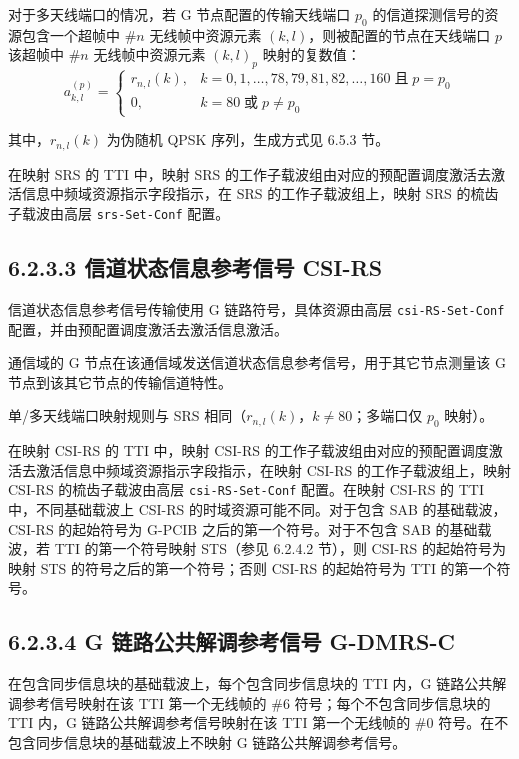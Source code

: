 \documentclass[11pt,a4paper]{ctexart}
\begin{document}
对于多天线端口的情况，若 G 节点配置的传输天线端口 $p_0$ 的信道探测信号的资源包含一个超帧中 \#$n$ 无线帧中资源元素 $(k,l)$，则被配置的节点在天线端口 $p$ 该超帧中 \#$n$ 无线帧中资源元素 $(k,l)_p$ 映射的复数值：
\begin{equation}
a_{k,l}^{(p)} =
\begin{cases}
r_{n,l}(k), & k = 0, 1, \ldots, 78, 79, 81, 82, \ldots, 160 \;\text{且}\; p = p_0 \\
0, & k = 80 \;\text{或}\; p \neq p_0
\end{cases}
\end{equation}

其中，$r_{n,l}(k)$ 为伪随机 QPSK 序列，生成方式见 6.5.3 节。

在映射 SRS 的 TTI 中，映射 SRS 的工作子载波组由对应的预配置调度激活去激活信息中频域资源指示字段指示，在 SRS 的工作子载波组上，映射 SRS 的梳齿子载波由高层 \texttt{srs-Set-Conf} 配置。

\subsection{6.2.3.3 信道状态信息参考信号 CSI-RS}

信道状态信息参考信号传输使用 G 链路符号，具体资源由高层 \texttt{csi-RS-Set-Conf} 配置，并由预配置调度激活去激活信息激活。

通信域的 G 节点在该通信域发送信道状态信息参考信号，用于其它节点测量该 G 节点到该其它节点的传输信道特性。

单/多天线端口映射规则与 SRS 相同（$r_{n,l}(k)$，$k \neq 80$；多端口仅 $p_0$ 映射）。

在映射 CSI-RS 的 TTI 中，映射 CSI-RS 的工作子载波组由对应的预配置调度激活去激活信息中频域资源指示字段指示，在映射 CSI-RS 的工作子载波组上，映射 CSI-RS 的梳齿子载波由高层 \texttt{csi-RS-Set-Conf} 配置。在映射 CSI-RS 的 TTI 中，不同基础载波上 CSI-RS 的时域资源可能不同。对于包含 SAB 的基础载波，CSI-RS 的起始符号为 G-PCIB 之后的第一个符号。对于不包含 SAB 的基础载波，若 TTI 的第一个符号映射 STS（参见 6.2.4.2 节），则 CSI-RS 的起始符号为映射 STS 的符号之后的第一个符号；否则 CSI-RS 的起始符号为 TTI 的第一个符号。

\subsection{6.2.3.4 G 链路公共解调参考信号 G-DMRS-C}

在包含同步信息块的基础载波上，每个包含同步信息块的 TTI 内，G 链路公共解调参考信号映射在该 TTI 第一个无线帧的 \#6 符号；每个不包含同步信息块的 TTI 内，G 链路公共解调参考信号映射在该 TTI 第一个无线帧的 \#0 符号。在不包含同步信息块的基础载波上不映射 G 链路公共解调参考信号。
\end{document}
